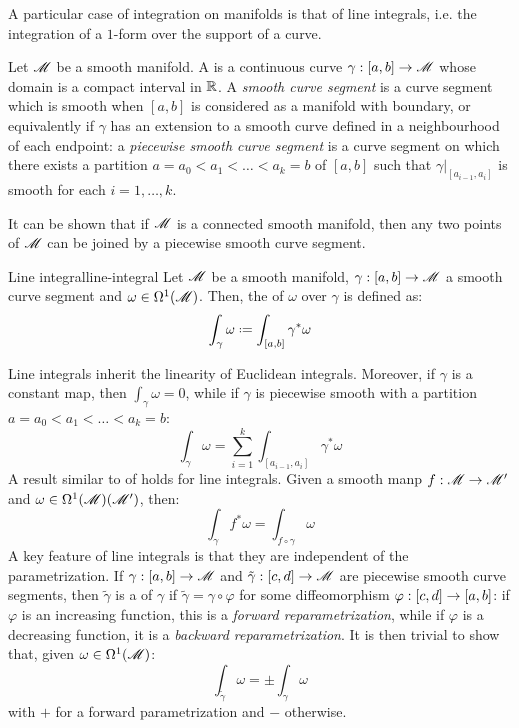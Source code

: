 A particular case of integration on manifolds is that of line integrals, i.e. the integration of a $ 1 $-form over the support of a curve.

Let $ \mathscr{M} $ be a smooth manifold. A  is a continuous curve $ \gamma : [a,b] \rightarrow \mathscr{M} $ whose domain is a compact interval in $ \mathbb{R} $. A \emph{smooth curve segment} is a curve segment which is smooth when $ [a,b] $ is considered as a manifold with boundary, or equivalently if $ \gamma $ has an extension to a smooth curve defined in a neighbourhood of each endpoint: a \emph{piecewise smooth curve segment} is a curve segment on which there exists a partition $ a = a_0 < a_1 < \dots < a_k = b $ of $ [a,b] $ such that $ \gamma \vert_{[a_{i-1} , a_i]} $ is smooth for each $ i = 1 , \dots , k $.

It can be shown that if $ \mathscr{M} $ is a connected smooth manifold, then any two points of $ \mathscr{M} $ can be joined by a piecewise smooth curve segment.

\begin{definition}{Line integral}{line-integral}
  Let $ \mathscr{M} $ be a smooth manifold, $ \gamma : [a,b] \rightarrow \mathscr{M} $ a smooth curve segment and $ \omega \in \Omega^{1}(\mathscr{M}) $. Then, the  of $ \omega $ over $ \gamma $ is defined as:
  \begin{equation}
    \int_\gamma \omega \defeq \int_{[a,b]} \gamma^* \omega
  \end{equation}
\end{definition}

Line integrals inherit the linearity of Euclidean integrals. Moreover, if $ \gamma $ is a constant map, then $ \int_\gamma \omega = 0 $, while if $ \gamma $ is piecewise smooth with a partition $ a = a_0 < a_1 < \dots < a_k = b $:
\begin{equation}
  \int_\gamma \omega = \sum_{i = 1}^k \int_{[a_{i-1} , a_i]} \gamma^* \omega
  \label{eq:line-piece}
\end{equation}
A result similar to  of  holds for line integrals. Given a smooth manp $ f : \mathscr{M} \rightarrow \mathscr{M}' $ and $ \omega \in \Omega^{1}(\mathscr{M})(\mathscr{M}') $, then:
\begin{equation}
  \int_\gamma f^* \omega = \int_{f \circ \gamma} \omega
\end{equation}
A key feature of line integrals is that they are independent of the parametrization. If $ \gamma : [a,b] \rightarrow \mathscr{M} $ and $ \tilde{\gamma} : [c,d] \rightarrow \mathscr{M} $ are piecewise smooth curve segments, then $ \tilde{\gamma} $ is a  of $ \gamma $ if $ \tilde{\gamma} = \gamma \circ \varphi $ for some diffeomorphism $ \varphi : [c,d] \rightarrow [a,b] $: if $ \varphi $ is an increasing function, this is a \emph{forward reparametrization}, while if $ \varphi $ is a decreasing function, it is a \emph{backward reparametrization}. It is then trivial to show that, given $ \omega \in \Omega^{1}(\mathscr{M}) $:
\begin{equation}
  \int_{\tilde{\gamma}} \omega = \pm \int_\gamma \omega
  \label{eq:line-reparam}
\end{equation}
with $ + $ for a forward parametrization and $ - $ otherwise.

